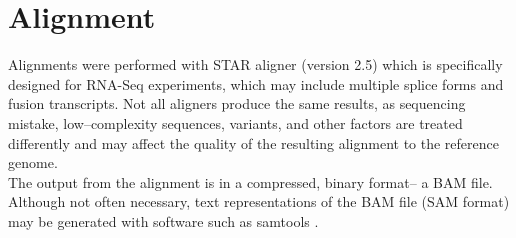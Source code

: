 \documentclass{article}
\begin{document}
{%

\section{Alignment}
Alignments were performed with STAR aligner  (version 2.5) \cite{star} which is specifically designed for RNA-Seq experiments, which may include multiple splice forms and fusion transcripts.  Not all aligners produce the same results, as sequencing mistake, low--complexity sequences, variants, and other factors are treated differently and may affect the quality of the resulting alignment to the reference genome.\\

The output from the alignment is in a compressed, binary format-- a BAM file.  Although not often necessary, text representations of the BAM file (SAM format) may be generated with software such as samtools \cite{samtools}.\\

}
\end{document}
